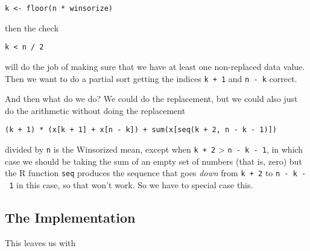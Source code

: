 \documentclass[
]{article}
\begin{document}
\begin{verbatim}
k <- floor(n * winsorize)
\end{verbatim}

then the check

\begin{verbatim}
k < n / 2
\end{verbatim}

will do the job of making sure that we have at least one non-replaced
data value. Then we want to do a partial sort getting the indices
\texttt{k\ +\ 1} and \texttt{n\ -\ k} correct.

And then what do we do? We could do the replacement, but we could also
just do the arithmetic without doing the replacement

\begin{verbatim}
(k + 1) * (x[k + 1] + x[n - k]) + sum(x[seq(k + 2, n - k - 1)])
\end{verbatim}

divided by \texttt{n} is the Winsorized mean, except when
\texttt{k\ +\ 2} \textgreater{} \texttt{n\ -\ k\ -\ 1}, in which case we
should be taking the sum of an empty set of numbers (that is, zero) but
the R function \texttt{seq} produces the sequence that goes \emph{down}
from \texttt{k\ +\ 2} to \texttt{n\ -\ k\ -\ 1} in this case, so that
won't work. So we have to special case this.

\hypertarget{the-implementation}{%
\subsection{The Implementation}\label{the-implementation}}

This leaves us with
\end{document}
